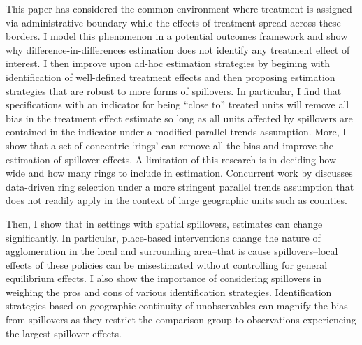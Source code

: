 \documentclass[11pt]{article}
\begin{document}
This paper has considered the common environment where treatment is assigned via administrative boundary while the effects of treatment spread across these borders. I model this phenomenon in a potential outcomes framework and show why difference-in-differences estimation does not identify any treatment effect of interest. I then improve upon ad-hoc estimation strategies by begining with identification of well-defined treatment effects and then proposing estimation strategies that are robust to more forms of spillovers. In particular, I find that specifications with an indicator for being ``close to'' treated units will remove all bias in the treatment effect estimate so long as all units affected by spillovers are contained in the indicator under a modified parallel trends assumption. More, I show that a set of concentric `rings' can remove all the bias and improve the estimation of spillover effects. A limitation of this research is in deciding how wide and how many rings to include in estimation. Concurrent work by \citet{Butts_2021} discusses data-driven ring selection under a more stringent parallel trends assumption that does not readily apply in the context of large geographic units such as counties. 

Then, I show that in settings with spatial spillovers, estimates can change significantly. In particular, place-based interventions change the nature of agglomeration in the local and surrounding area--that is cause spillovers--local effects of these policies can be misestimated without controlling for general equilibrium effects. I also show the importance of considering spillovers in weighing the pros and cons of various identification strategies. Identification strategies based on geographic continuity of unobservables can magnify the bias from spillovers as they restrict the comparison group to observations experiencing the largest spillover effects.

\setlength{\bibsep}{0.0pt}


\appendix 
{}
\renewcommand{\thefigure}{\Alph{section}\arabic{figure}}
\renewcommand{\thetable}{\Alph{section}\arabic{table}}
\end{document}
